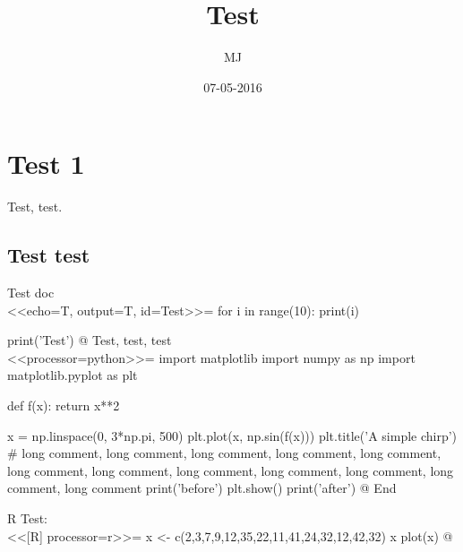 \documentclass{article}
\title{Test}
\date{07-05-2016}
\author{MJ}
\begin{document}
	\maketitle
	\newpage

	\section{Test 1}
	Test, test.

	\subsection{Test test}
	Test doc\\
	<<echo=T, output=T, id=Test>>=
for i in range(10):
    print(i)

print('Test')
    @
	Test, test, test\\
	<<processor=python>>=
import matplotlib
import numpy as np
import matplotlib.pyplot as plt

def f(x):
    return x**2

x = np.linspace(0, 3*np.pi, 500)
plt.plot(x, np.sin(f(x)))
plt.title('A simple chirp')
# long comment, long comment, long comment, long comment, long comment, long comment, long comment, long comment, long comment, long comment, long comment, long comment
print('before')
plt.show()
print('after')
    @
	End

	R Test:\\
<<[R] processor=r>>=
x <- c(2,3,7,9,12,35,22,11,41,24,32,12,42,32)
x
plot(x)
@
\end{document}
